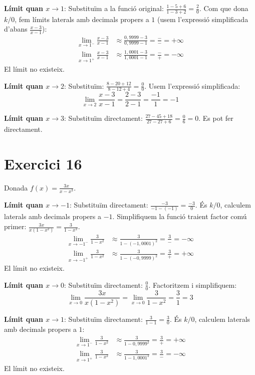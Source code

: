 \documentclass[12pt,a4paper]{article}
\begin{document}
\textbf{Límit quan $x \to 1$}:
Substituïm a la funció original: $\frac{1-5+6}{1-3+2} = \frac{2}{0}$. Com que dona $k/0$, fem límits laterals amb decimals propers a $1$ (usem l'expressió simplificada d'abans $\frac{x-3}{x-1}$):
\begin{align*}
    \lim_{x \to 1^-} \frac{x-3}{x-1} & \approx \frac{0,9999 - 3}{0,9999 - 1} = \frac{-}{-} = +\infty \\
    \lim_{x \to 1^+} \frac{x-3}{x-1} & \approx \frac{1,0001 - 3}{1,0001 - 1} = \frac{-}{+} = -\infty
\end{align*}
El límit no existeix.

\textbf{Límit quan $x \to 2$}:
Substituïm: $\frac{8-20+12}{8-12+4} = \frac{0}{0}$. Usem l'expressió simplificada:
\[ \lim_{x \to 2} \frac{x-3}{x-1} = \frac{2-3}{2-1} = \frac{-1}{1} = -1 \]

\textbf{Límit quan $x \to 3$}:
Substituïm directament: $\frac{27-45+18}{27-27+6} = \frac{0}{6} = 0$. Es pot fer directament.

\vspace{0.5cm}
\section*{Exercici 16}
Donada $f(x) = \frac{3x}{x-x^3}$.

\textbf{Límit quan $x \to -1$}:
Substituïm directament: $\frac{-3}{-1 - (-1)} = \frac{-3}{0}$. És $k/0$, calculem laterals amb decimals propers a $-1$. Simplifiquem la funció traient factor comú primer: $\frac{3x}{x(1-x^2)} = \frac{3}{1-x^2}$.
\begin{align*}
    \lim_{x \to -1^-} \frac{3}{1-x^2} & \approx \frac{3}{1 - (-1,0001)^2} = \frac{3}{-} = -\infty \\
    \lim_{x \to -1^+} \frac{3}{1-x^2} & \approx \frac{3}{1 - (-0,9999)^2} = \frac{3}{+} = +\infty
\end{align*}
El límit no existeix.

\textbf{Límit quan $x \to 0$}:
Substituïm directament: $\frac{0}{0}$. Factoritzem i simplifiquem:
\[ \lim_{x \to 0} \frac{3x}{x(1-x^2)} = \lim_{x \to 0} \frac{3}{1-x^2} = \frac{3}{1} = 3 \]

\textbf{Límit quan $x \to 1$}:
Substituïm directament: $\frac{3}{1-1} = \frac{3}{0}$. És $k/0$, calculem laterals amb decimals propers a $1$:
\begin{align*}
    \lim_{x \to 1^-} \frac{3}{1-x^2} & \approx \frac{3}{1 - 0,9999^2} = \frac{3}{+} = +\infty \\
    \lim_{x \to 1^+} \frac{3}{1-x^2} & \approx \frac{3}{1 - 1,0001^2} = \frac{3}{-} = -\infty
\end{align*}
El límit no existeix.
\end{document}
